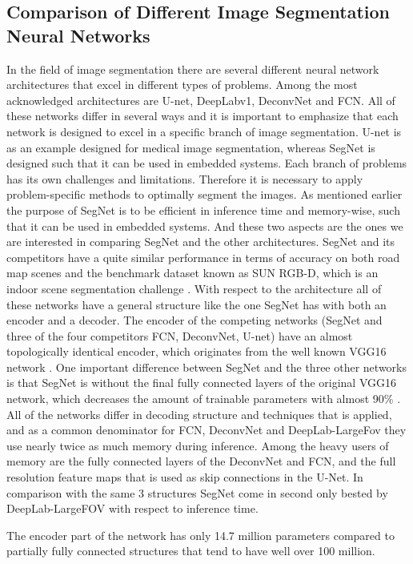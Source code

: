 \documentclass{article}
\begin{document}
\label{sec:foot}
\subsection{Comparison of Different Image Segmentation Neural Networks}
In the field of image segmentation there are several different neural network architectures that excel in different types of problems. Among the most acknowledged architectures are U-net, DeepLabv1, DeconvNet and FCN. 
All of these networks differ in several ways and it is important to emphasize that each network is designed to excel in a specific branch of image segmentation. U-net is as an example designed for medical image segmentation, whereas SegNet is designed such that it can be used in embedded systems. Each branch of problems has its own challenges and limitations. Therefore it is necessary to apply problem-specific methods to optimally segment the images. 
As mentioned earlier the purpose of SegNet is to be efficient in inference time and memory-wise, such that it can be used in embedded systems. And these two aspects are the ones we are interested in comparing SegNet and the other architectures. 
SegNet and its competitors have a quite similar performance in terms of accuracy on both road map scenes and the benchmark dataset known as SUN RGB-D, which is an indoor scene segmentation challenge \cite{seg}. 
With respect to the architecture all of these networks have a general structure like the one SegNet has with both an encoder and a decoder. The encoder of the competing networks (SegNet and three of the four competitors FCN, DeconvNet, U-net) have an almost topologically identical encoder, which originates from the well known VGG16 network \cite{VGG16}. One important difference between SegNet and the three other networks is that SegNet is without the final fully connected layers of the original VGG16 network, which decreases the amount of trainable parameters with almost 90\% \cite{seg}. 
All of the networks differ in decoding structure and techniques that is applied, and as a common denominator for FCN, DeconvNet and DeepLab-LargeFov they use nearly twice as much memory during inference. Among the heavy users of memory are the fully connected layers of the DeconvNet and FCN, and the full resolution feature maps that is used as skip connections in the U-Net. In comparison with the same 3 structures SegNet come in second only bested by DeepLab-LargeFOV with respect to inference time.


The encoder part of the network has only 14.7 million parameters compared to partially fully connected structures that tend to have well over 100 million. \cite{seg}
\end{document}
